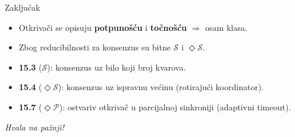\documentclass[aspectratio=169,11pt]{beamer}
\newcommand{\Ds}{\ensuremath{\mathcal{S}}}
\newcommand{\eP}{\ensuremath{\Diamond\mathcal{P}}}
\newcommand{\eS}{\ensuremath{\Diamond\mathcal{S}}}
\begin{document}

\begin{frame}{Zaključak}
  \begin{itemize}
    \item Otkrivači se opisuju \textbf{potpunošću} i \textbf{točnošću} $\Rightarrow$
      osam klasa.
    \item Zbog reducibilnosti za konsenzus su bitne \Ds{} i \eS.
    \item \textbf{15.3} (\Ds): konsenzus uz bilo koji broj kvarova.
    \item \textbf{15.4} (\eS): konsenzus uz ispravnu većinu (rotirajući koordinator).
    \item \textbf{15.7} (\eP): ostvariv otkrivač u parcijalnoj sinkroniji
      (adaptivni timeout).
  \end{itemize}
  \vfill
  \centering \emph{Hvala na pažnji!}
\end{frame}
\end{document}
